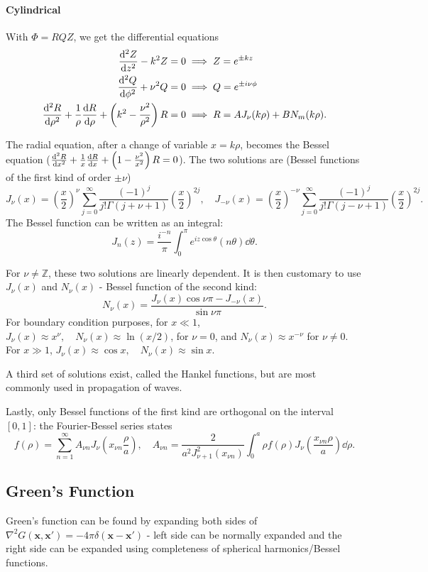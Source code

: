 \documentclass{article}
\begin{document}
\paragraph{Cylindrical} With $\Phi=RQZ$, we get the differential equations
\begin{align*}
    \frac{\mathrm{d}^{2}Z}{\mathrm{d}{z}^{2}}-k^2Z&=0\implies Z=e^{\pm kz}\\
    \frac{\mathrm{d}^{2}Q}{\mathrm{d}{\phi}^{2}}+\nu^2Q&=0\implies Q=e^{\pm i\nu\phi}\\
    \frac{\mathrm{d}^{2}R}{\mathrm{d}{\rho}^{2}}+\frac 1\rho\frac{\mathrm{d}R}{\mathrm{d}\rho}+\left(k^2-\frac{\nu^2}{\rho^2}\right)R&=0\implies R=AJ_\nu(k\rho)+BN_m(k\rho).
\end{align*}

The radial equation, after a change of variable $x=k\rho$, becomes the Bessel equation ($\frac{\mathrm{d}^{2}R}{\mathrm{d}{x}^{2}}+\frac 1x\frac{\mathrm{d}R}{\mathrm{d}x}+\left(1-\frac{\nu^2}{x^2}\right)R=0$). The two solutions are (Bessel functions of the first kind of order $\pm\nu$)
$$J_\nu(x)=\left(\frac x2\right)^\nu\sum^\infty_{j=0}\frac{(-1)^j}{j!\Gamma(j+\nu+1)}\left(\frac x2\right)^{2j},\quad J_{-\nu}(x)=\left(\frac x2\right)^{-\nu}\sum^\infty_{j=0}\frac{(-1)^j}{j!\Gamma(j-\nu+1)}\left(\frac x2\right)^{2j}.$$
The Bessel function can be written as an integral:
$$J_n(z)=\frac{i^{-n}}{\pi}\int^\pi_0e^{iz\cos\theta}(n\theta)\dd\theta.$$


For $\nu\ne\mathbb Z$, these two solutions are linearly dependent. It is then customary to use $J_\nu(x)$ and $N_\nu(x)$ - Bessel function of the second kind:
$$N_\nu(x)=\frac{J_\nu(x)\cos\nu\pi-J_{-\nu}(x)}{\sin\nu\pi}.$$
For boundary condition purposes, for $x\ll 1$, $J_\nu(x)\approx x^\nu,\quad N_\nu(x)\approx \ln(x/2)$, for $\nu=0$, and $N_\nu(x)\approx x^{-\nu}$ for $\nu\ne 0$. For $x\gg 1$, $J_\nu(x)\approx\cos x,\quad N_\nu(x)\approx\sin x$.

A third set of solutions exist, called the Hankel functions, but are most commonly used in propagation of waves.

Lastly, only Bessel functions of the first kind are orthogonal on the interval $[0,1]$: the Fourier-Bessel series states 
$$f(\rho)=\sum^\infty_{n=1}A_{\nu n}J_\nu\left(x_{\nu n}\frac\rho a\right),\quad A_{\nu n}=\frac 2{a^2J^2_{\nu+1}(x_{\nu n})}\int^a_0\rho f(\rho)J_\nu\left(\frac{x_{\nu n}\rho}a\right)\dd\rho.$$

\subsection{Green's Function}
Green's function can be found by expanding both sides of $\nabla^2G(\mathbf x,\mathbf x')=-4\pi\delta(\mathbf x-\mathbf x')$ - left side can be normally expanded and the right side can be expanded using completeness of spherical harmonics/Bessel functions. 
\end{document}
